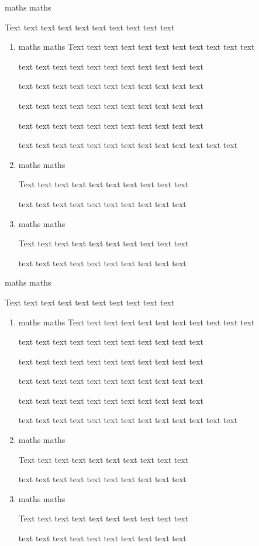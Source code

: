 \documentclass[12pt,a4paper,openany]{report}
\begin{document}
\begin{exercise}
	maths maths
	
	Text text text text text text text text text text 
	
	
	\begin{enumerate}
		\item 
		
		maths maths
		Text text text text text text text text text text text
		
		text text text text text text text text text text text
		
		text text text text text text text text text text text
		
		text text text text text text text text text text text
		
		text text text text text text text text text text text
		
		text text text text text text text text text text text text text
		\item
		
		maths maths
		
		Text text text text text text text text text text 
		
		text text text text text text text text text text
		
		\item 
		
		maths maths
		
		Text text text text text text text text text text 
		
		text text text text text text text text text text
		
		
	\end{enumerate}
	\tcblower
	maths maths
	
	Text text text text text text text text text text 
	
	
	\begin{enumerate}
		\item 
		
		maths maths
		Text text text text text text text text text text text
		
		text text text text text text text text text text text
		
		text text text text text text text text text text text
		
		text text text text text text text text text text text
		
		text text text text text text text text text text text
		
		text text text text text text text text text text text text text
		\item
		
		maths maths
		
		Text text text text text text text text text text 
		
		text text text text text text text text text text
		
		\item 
		
		maths maths
		
		Text text text text text text text text text text 
		
		text text text text text text text text text text
		
		
	\end{enumerate}
\end{exercise}
\end{document}

